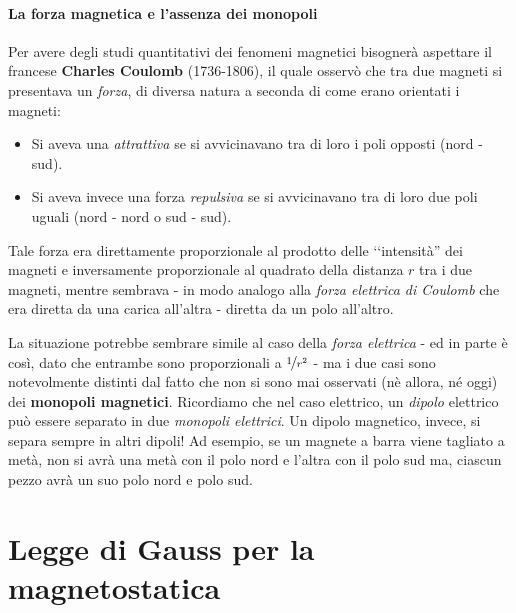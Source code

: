 \paragraph{La forza magnetica e l'assenza dei monopoli}
Per avere degli studi quantitativi dei fenomeni magnetici bisognerà aspettare il francese \textbf{Charles Coulomb} (1736-1806), il quale osservò che tra due magneti si presentava un \textit{forza}, di diversa natura a seconda di come erano orientati i magneti:
\begin{itemize}
	\item Si aveva una \textit{attrattiva} se si avvicinavano tra di loro i poli opposti (nord - sud).
	\item Si aveva invece una forza \textit{repulsiva} se si avvicinavano tra di loro due poli uguali (nord - nord o sud - sud).
\end{itemize}
Tale forza era direttamente proporzionale al prodotto delle ‘‘intensità'' dei magneti e inversamente proporzionale al quadrato della distanza $r$ tra i due magneti, mentre sembrava - in modo analogo alla \textit{forza elettrica di Coulomb} che era diretta da una carica all'altra - diretta da un polo all'altro.

La situazione potrebbe sembrare simile al caso della \textit{forza elettrica} - ed in parte è così, dato che entrambe sono proporzionali a $\nicefrac{1}{r^2}$ - ma i due casi sono notevolmente distinti dal fatto che non si sono mai osservati (nè allora, né oggi) dei \textbf{monopoli magnetici}. Ricordiamo che nel caso elettrico, un \textit{dipolo} elettrico può essere separato in due \textit{monopoli elettrici}.
Un dipolo magnetico, invece, si separa sempre in altri dipoli! Ad esempio, se un magnete a barra viene tagliato a metà, non si avrà una metà con il polo nord e l'altra con il polo sud ma, ciascun pezzo avrà un suo polo nord e polo sud.
\section{Legge di Gauss per la magnetostatica}
